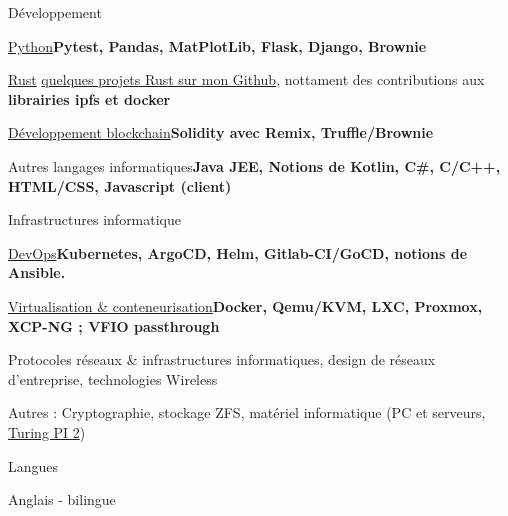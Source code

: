 \begin{cventries}
  \cventry
    {} %
    {Développement} %
    {} %
    {} %
    {
      \begin{cvitems} %
        \item {\underline{Python}\qquad\qquad\qquad\qquad\qquad\qquad\qquad\quad\textbf{Pytest, Pandas, MatPlotLib, Flask, Django, Brownie}}
        \item {\underline{Rust} \qquad\qquad\qquad\qquad\qquad\qquad\qquad\qquad \href{https://github.com/guillheu?tab=repositories&q=&type=&language=rust&sort=}{quelques projets Rust sur mon Github}, nottament des contributions aux \textbf{librairies ipfs et docker}}
        \item {\underline{Développement blockchain}\qquad\qquad\qquad\quad\textbf{Solidity avec Remix, Truffle/Brownie}}
        \item {Autres langages informatiques\qquad\qquad\qquad\textbf{Java JEE, Notions de Kotlin, C\#, C/C++, HTML/CSS, Javascript (client)}}
      \end{cvitems}
    }
  \cventry
    {} %
    {Infrastructures informatique} %
    {} %
    {} %
    {
      \begin{cvitems} %
        \item {\underline{DevOps}\qquad\qquad\qquad\qquad\qquad\qquad\qquad\quad\textbf{Kubernetes, ArgoCD, Helm, Gitlab-CI/GoCD, notions de Ansible.}}
        \item {\underline{Virtualisation \& conteneurisation}\qquad\qquad\quad\textbf{Docker, Qemu/KVM, LXC, Proxmox, XCP-NG ; VFIO passthrough}}
        \item {Protocoles réseaux \& infrastructures informatiques, design de réseaux d'entreprise, technologies Wireless}
        \item {Autres : Cryptographie, stockage ZFS, matériel informatique (PC et serveurs, \href{https://turingpi.com/}{Turing PI 2})\\}
      \end{cvitems}
    }
  \cventry
    {} %
    {Langues} %
    {} %
    {} %
    {
      \begin{cvitems} %
        \item {Anglais - bilingue}
      \end{cvitems}
    }
\end{cventries}